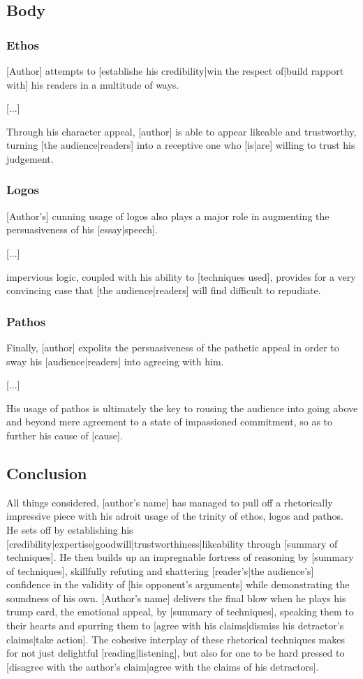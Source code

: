 \subsection{Body}
\subsubsection{Ethos}
[Author] attempts to [establishe his credibility|win the respect of|build rapport with] his readers in a multitude of ways. 

[...] 

\noindent Through his character appeal, [author] is able to appear likeable and trustworthy, turning [the audience|readers] into a receptive one who [is|are] willing to trust his judgement.

\subsubsection{Logos}
[Author's] cunning usage of logos also plays a major role in augmenting the persuasiveness of his [essay|speech]. 

[...]

\noindent [Author's] impervious logic, coupled with his ability to [techniques used], provides for a very convincing case that [the audience|readers] will find difficult to repudiate.

\subsubsection{Pathos}
Finally, [author] expolits the persuasiveness of the pathetic appeal in order to sway his [audience|readers] into agreeing with him. 

[...]

\noindent His usage of pathos is ultimately the key to rousing the audience into going above and beyond mere agreement to a state of impassioned commitment, so as to further his cause of [cause].

\subsection{Conclusion}
All things considered, [author's name] has managed to pull off a rhetorically impressive piece with his adroit usage of the trinity of ethos, logos and pathos. He sets off by establishing his [credibility|expertise|goodwill|trustworthiness|likeability through [summary of techniques]. He then builds up an impregnable fortress of reasoning by [summary of techniques], skillfully refuting and shattering [reader's|the audience's] confidence in the validity of [his opponent's arguments] while demonstrating the soundness of his own. [Author's name] delivers the final blow when he plays his trump card, the emotional appeal, by [summary of techniques], speaking them to their hearts and spurring them to [agree with his claims|dismiss his detractor's claims|take action]. The cohesive interplay of these rhetorical techniques makes for not just delightful [reading|listening], but also for one to be hard pressed to [disagree with the author's claim|agree with the claims of his detractors].

